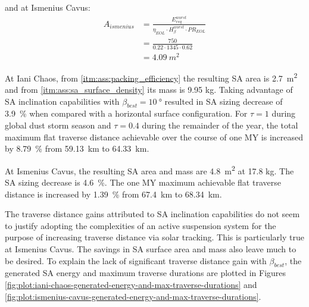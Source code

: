 and at Ismenius Cavus:
\begin{align}
  \label{calc:solar_cell_area_iani_chaos}
  A_{ismenius} &= \frac{E_{req}^{worst}}{\eta_{EOL} \cdot H_{\beta}^{worst} \cdot PR_{EOL}}\\
               &= \frac{750}{0.22 \cdot 1345 \cdot 0.62}\\
               &= \SI{4.09}{m^{2}}
\end{align}

At Iani Chaos, from \ref{itm:ass:packing_efficiency} the resulting \ac{SA} area is  \SI{2.7}{m^{2}} and from \ref{itm:ass:sa_surface_density} its mass is 9.95 \si{\kilo\gram}. Taking advantage of \ac{SA} inclination capabilities with $\beta_{best} = \SI{10}{\degree}$ resulted in \ac{SA} sizing decrease of \SI{3.9}{\percent} when compared with a horizontal surface configuration. For $\tau = 1$ during global dust storm season and $\tau = 0.4$ during the remainder of the year, the total maximum flat traverse distance achievable over the course of one \ac{MY} is increased by \SI{8.79}{\percent} from \SI{59.13}{\kilo\meter} to \SI{64.33}{\kilo\meter}.

At Ismenius Cavus, the resulting \ac{SA} area and mass are \SI{4.8}{m^{2}} at 17.8 \si{\kilo\gram}. The \ac{SA} sizing decrease is \SI{4.6}{\percent}. The one \ac{MY} maximum achievable flat traverse distance is increased by \SI{1.39}{\percent} from \SI{67.4}{\kilo\meter} to \SI{68.34}{\kilo\meter}.

The traverse distance gains attributed to \ac{SA} inclination capabilities do not seem to justify adopting the complexities of an active suspension system for the purpose of increasing traverse distance via solar tracking. This is particularly true at Ismenius Cavus. The savings in \ac{SA} surface area and mass also leave much to be desired. To explain the lack of significant traverse distance gain with $\beta_{best}$, the generated \ac{SA} energy and  maximum traverse durations are plotted in Figures \ref{fig:plot:iani-chaos-generated-energy-and-max-traverse-durations} and \ref{fig:plot:ismenius-cavus-generated-energy-and-max-traverse-durations}.

